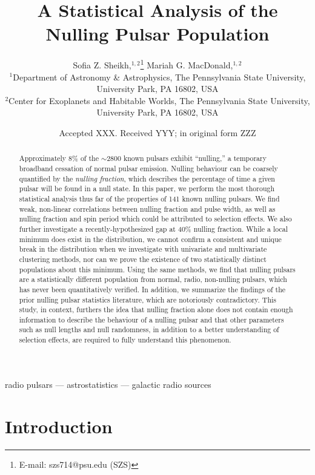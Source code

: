 \documentclass[fleqn,usenatbib]{mnras}
\title[Nulling Pulsar Statistics]{A Statistical Analysis of the Nulling Pulsar Population}
\author[Sheikh and MacDonald]{
Sofia Z. Sheikh,$^{1, 2}$\thanks{E-mail: szs714@psu.edu (SZS)}
Mariah G. MacDonald,$^{1, 2}$
\\
$^{1}$Department of Astronomy \& Astrophysics, The Pennsylvania State University, University Park, PA 16802, USA\\
$^{2}$Center for Exoplanets and Habitable Worlds, The Pennsylvania State University, University Park, PA 16802, USA\\
}
\date{Accepted XXX. Received YYY; in original form ZZZ}
\begin{document}
\label{firstpage}
\pagerange{\pageref{firstpage}--\pageref{lastpage}}
\maketitle

\begin{abstract}
Approximately 8\% of the $\sim$2800 known pulsars exhibit ``nulling,'' a temporary broadband cessation of normal pulsar emission. Nulling behaviour can be coarsely quantified by the \textit{nulling fraction}, which describes the percentage of time a given pulsar will be found in a null state. In this paper, we perform the most thorough statistical analysis thus far of the properties of 141 known nulling pulsars. We find weak, non-linear correlations between nulling fraction and pulse width, as well as nulling fraction and spin period which could be attributed to selection effects. We also further investigate a recently-hypothesized gap at 40\% nulling fraction. While a local minimum does exist in the distribution, we cannot confirm a consistent and unique break in the distribution when we investigate with univariate and multivariate clustering methods, nor can we prove the existence of two statistically distinct populations about this minimum. Using the same methods, we find that nulling pulsars are a statistically different population from normal, radio, non-nulling pulsars, which has never been quantitatively verified. In addition, we summarize the findings of the prior nulling pulsar statistics literature, which are notoriously contradictory. This study, in context, furthers the idea that nulling fraction alone does not contain enough information to describe the behaviour of a nulling pulsar and that other parameters such as null lengths and null randomness, in addition to a better understanding of selection effects, are required to fully understand this phenomenon. 
\end{abstract}

\begin{keywords}
radio pulsars --- astrostatistics --- galactic radio sources
\end{keywords}



\section{Introduction}
\end{document}
